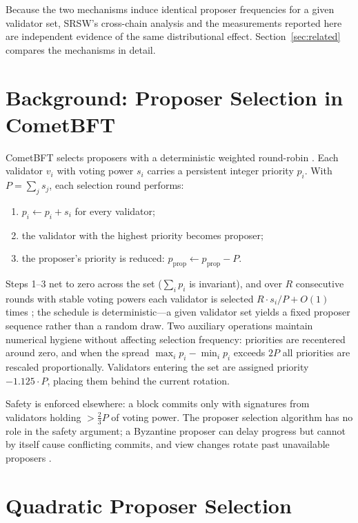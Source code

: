 \documentclass[11pt,a4paper]{article}
\begin{document}
Because the two mechanisms induce identical proposer frequencies for a given validator set, SRSW's cross-chain analysis and the measurements reported here are independent evidence of the same distributional effect. Section~\ref{sec:related} compares the mechanisms in detail.

\section{Background: Proposer Selection in CometBFT}
\label{sec:background}

CometBFT selects proposers with a deterministic weighted round-robin \cite{cometbft}. Each validator $v_i$ with voting power $s_i$ carries a persistent integer priority $p_i$. With $P = \sum_j s_j$, each selection round performs:

\begin{enumerate}
    \item $p_i \leftarrow p_i + s_i$ for every validator;
    \item the validator with the highest priority becomes proposer;
    \item the proposer's priority is reduced: $p_{\text{prop}} \leftarrow p_{\text{prop}} - P$.
\end{enumerate}

Steps 1--3 net to zero across the set ($\sum_i p_i$ is invariant), and over $R$ consecutive rounds with stable voting powers each validator is selected $R \cdot s_i / P + O(1)$ times \cite{cometbft}; the schedule is deterministic---a given validator set yields a fixed proposer sequence rather than a random draw. Two auxiliary operations maintain numerical hygiene without affecting selection frequency: priorities are recentered around zero, and when the spread $\max_i p_i - \min_i p_i$ exceeds $2P$ all priorities are rescaled proportionally. Validators entering the set are assigned priority $-1.125 \cdot P$, placing them behind the current rotation.

Safety is enforced elsewhere: a block commits only with signatures from validators holding $> \frac{2}{3} P$ of voting power. The proposer selection algorithm has no role in the safety argument; a Byzantine proposer can delay progress but cannot by itself cause conflicting commits, and view changes rotate past unavailable proposers \cite{buchman,bravo}.

\section{Quadratic Proposer Selection}
\label{sec:qps}
\end{document}

